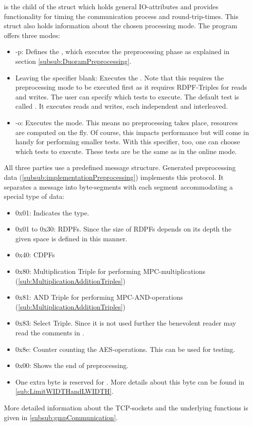  is the child of the  struct which holds general IO-attributes and provides functionality for timing the communication process and round-trip-times.
This struct also holds information about the chosen processing mode.
The program offers three modes: 
\begin{itemize}
    \item -p: 
    Defines the , which executes the preprocessing phase as explained in section \ref{subsub:DuoramPreprocessing}.
    \item Leaving the specifier blank: 
    Executes the .
    Note that this requires the preprocessing mode to be executed first as it requires RDPF-Triples for reads and writes.
    The user can specify which tests to execute.
    The default test is called .
    It executes reads and writes, each independent and interleaved.
    \item -o:
    Executes the  mode.
    This means no preprocessing takes place, resources are computed on the fly.
    Of course, this impacts performance but will come in handy for performing smaller tests.
    With this specifier, too, one can choose which tests to execute.
    These tests are be the same as in the online mode.
\end{itemize}

All three parties use a predefined message structure.
Generated preprocessing data (\ref{subsub:implementationPreprocessing}) implements this protocol.
It separates a message into byte-segments with each segment accommodating a special type of data:
\begin{itemize}\label{itemize:preprocessingStructure}
    \item 0x01: Indicates the type.
    \item 0x01 to 0x30: RDPFs. Since the size of RDPFs depends on its depth the given space is defined in this manner.
    \item 0x40: CDPFs 
    \item 0x80: Multiplication Triple for performing MPC-multiplications (\ref{sub:MultiplicationAdditionTriples})
    \item 0x81: AND Triple for performing MPC-AND-operations (\ref{sub:MultiplicationAdditionTriples})
    \item 0x83: Select Triple. Since it is not used further the benevolent reader may read the comments in .
    \item 0x8e: Counter counting the AES-operations. This can be used for testing.
    \item 0x00: Shows the end of preprocessing. 
    \item One extra byte is reserved for .
    More details about this byte can be found in \ref{sub:LimitWIDTHandLWIDTH}.
\end{itemize}

More detailed information about the TCP-sockets and the underlying functions is given in \ref{subsub:gmpCommunication}.